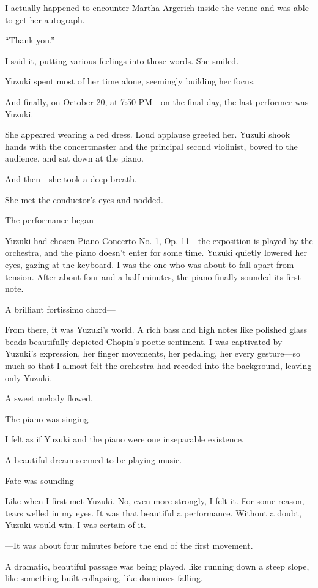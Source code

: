 \documentclass[
    a4paper,
    12pt,
    twoside,
    openany,
    UTF8,
    fontset=windows
]{ctexbook}
\begin{document}
I actually happened to encounter Martha Argerich inside the venue and was able to get her autograph.

``Thank you.''

I said it, putting various feelings into those words. She smiled.

Yuzuki spent most of her time alone, seemingly building her focus.

And finally, on October 20, at 7:50 PM---on the final day, the last performer was Yuzuki.

She appeared wearing a red dress. Loud applause greeted her. Yuzuki shook hands with the concertmaster and the principal second violinist, bowed to the audience, and sat down at the piano.

And then---she took a deep breath.

She met the conductor's eyes and nodded.

The performance began---

Yuzuki had chosen Piano Concerto No. 1, Op. 11---the exposition is played by the orchestra, and the piano doesn't enter for some time. Yuzuki quietly lowered her eyes, gazing at the keyboard. I was the one who was about to fall apart from tension. After about four and a half minutes, the piano finally sounded its first note.

A brilliant fortissimo chord---

From there, it was Yuzuki's world. A rich bass and high notes like polished glass beads beautifully depicted Chopin's poetic sentiment. I was captivated by Yuzuki's expression, her finger movements, her pedaling, her every gesture---so much so that I almost felt the orchestra had receded into the background, leaving only Yuzuki.

A sweet melody flowed.

The piano was singing---

I felt as if Yuzuki and the piano were one inseparable existence.

A beautiful dream seemed to be playing music.

Fate was sounding---

Like when I first met Yuzuki. No, even more strongly, I felt it. For some reason, tears welled in my eyes. It was that beautiful a performance. Without a doubt, Yuzuki would win. I was certain of it.

---It was about four minutes before the end of the first movement.

A dramatic, beautiful passage was being played, like running down a steep slope, like something built collapsing, like dominoes falling.
\end{document}
